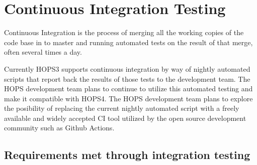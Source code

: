%
%
\section{Continuous Integration Testing}
\label{sec:integration}

Continuous Integration is the process of merging all the working copies of the code
base in to master and running automated tests on the result of that merge, often 
several times a day.

Currently HOPS3 supports continuous integration by way of nightly automated scripts 
that report back the results of those tests to the development team.
The HOPS development team plans to continue to utilize this automated testing
and make it compatible with HOPS4. The HOPS development team plans to explore the posibility
of replacing the current nightly automated script with a freely available and widely
accepted CI tool utilized by the open source development community such as Github Actions. 

\subsection{Requirements met through integration testing}
\label{sec:integrationreqs}



%
%
